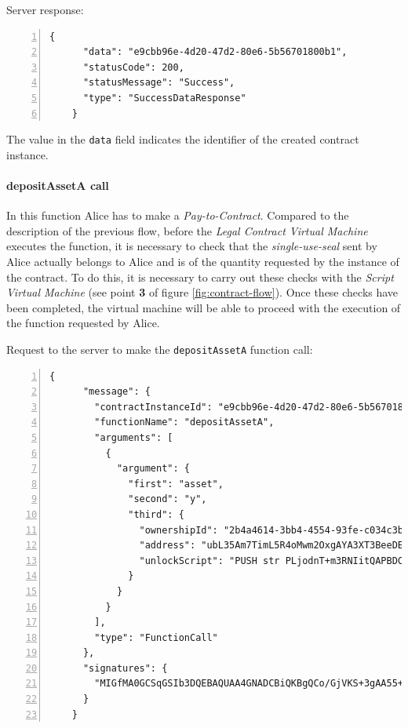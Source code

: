 Server response:
{
  \small
  \begin{Verbatim}[numbers=left,xleftmargin=1cm,firstnumber=1,breaklines=true,breakanywhere=true,tabsize=2]
    {
      "data": "e9cbb96e-4d20-47d2-80e6-5b56701800b1",
      "statusCode": 200,
      "statusMessage": "Success",
      "type": "SuccessDataResponse"
    }
  \end{Verbatim}
}

The value in the \verb|data| field indicates the identifier of the created contract instance.

\paragraph{depositAssetA call}

In this function Alice has to make a \textit{Pay-to-Contract}. Compared to the description of the previous 
flow, before the \textit{Legal Contract Virtual Machine} executes the function, it is necessary to check 
that the \textit{single-use-seal} sent by Alice actually belongs to Alice and is of the quantity requested 
by the instance of the contract. To do this, it is necessary to carry out these checks with the 
\textit{Script Virtual Machine} (see point \textbf{3} of figure \ref{fig:contract-flow}). Once these 
checks have been completed, the virtual machine will be able to proceed with the execution of the 
function requested by Alice.

Request to the server to make the \verb|depositAssetA| function call:
{
  \small
  \begin{Verbatim}[numbers=left,xleftmargin=1cm,firstnumber=1,breaklines=true,breakanywhere=true,tabsize=2]
    {
      "message": {
        "contractInstanceId": "e9cbb96e-4d20-47d2-80e6-5b56701800b1",
        "functionName": "depositAssetA",
        "arguments": [
          {
            "argument": {
              "first": "asset",
              "second": "y",
              "third": {
                "ownershipId": "2b4a4614-3bb4-4554-93fe-c034c3ba5a9c",
                "address": "ubL35Am7TimL5R4oMwm2OxgAYA3XT3BeeDE56oxqdLc=",
                "unlockScript": "PUSH str PLjodnT+m3RNIitQAPBDCsRmJPHCqrwZOY/CPiHFZGnl+DRN6soqxMy3ehTFaUwxBjjf7qfBfvTDq5oBItTFrtz1Rn5SDS1ybdbkwpKaOXVglNOw7ZEG9bbZ1mo1oA7IAjRiIilzUetCstE5rPZIf9XOXr/RQ5AHkZUn2CztsvA=\nPUSH str MIGfMA0GCSqGSIb3DQEBAQUAA4GNADCBiQKBgQCo/GjVKS+3gAA55+kko41yINdOcCLQMSBQyuTTkKHE1mhu/TgOpivM0wLPsSga8hQMr3+v3aR0IF/vfCRf6SdiXmWx/jflmEXtnT6fkGcnV6dGNUpHWXSpwUIDt0N88jfnEqekx4S+KDCKg99sGEeHeT65fKS8lB0gjHMt9AOriwIDAQAB\n"
              }
            }
          }
        ],
        "type": "FunctionCall"
      },
      "signatures": {   
        "MIGfMA0GCSqGSIb3DQEBAQUAA4GNADCBiQKBgQCo/GjVKS+3gAA55+kko41yINdOcCLQMSBQyuTTkKHE1mhu/TgOpivM0wLPsSga8hQMr3+v3aR0IF/vfCRf6SdiXmWx/jflmEXtnT6fkGcnV6dGNUpHWXSpwUIDt0N88jfnEqekx4S+KDCKg99sGEeHeT65fKS8lB0gjHMt9AOriwIDAQAB": "MVm0fv9zBntC7ElPhNYaISpgmOdCh8blRsvkU2gtulbWQvwg/CuKtcOIHxakTrffnrW7iw/KLB0n46HulBL6KAcl02U9HSt0+YwX3imJ50QVWU7kmLoMy5d8uQ+seZzXifsaf7OvE1OpAWXNwh7ICsRZv9U6aV39c13SUqwHjTs="
      }
    }
  \end{Verbatim}
}

